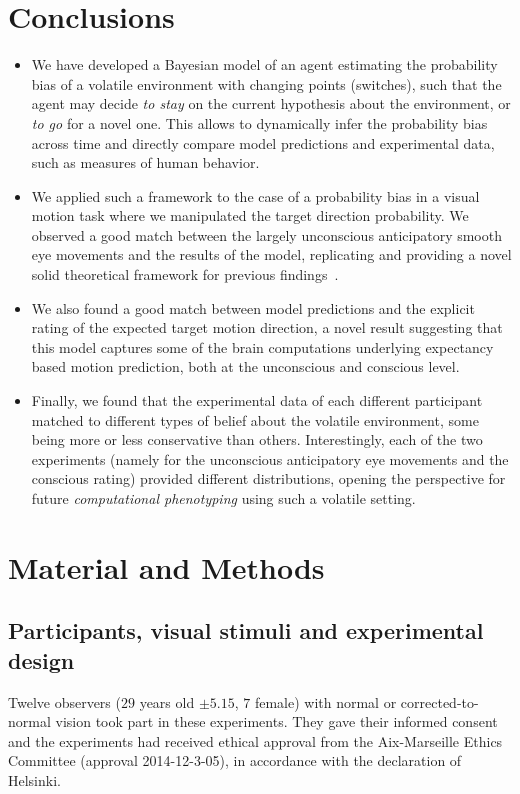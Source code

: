 \documentclass[10pt,letterpaper]{article}
\newcommand{\citep}[1]{\cite{#1}}
\begin{document}
\section{Conclusions}
\begin{itemize}\setlength{\itemsep}{0ex}
\item We have developed a Bayesian model of an agent estimating the probability bias of a volatile environment with changing points (switches), such that the agent may decide \textit{to stay} on the current hypothesis about the environment, or \textit{to go} for a novel one. This allows to dynamically infer the probability bias across time and directly compare model predictions and experimental data, such as measures of human behavior.
\item We applied such a framework to the case of a probability bias in a visual motion task where we manipulated the target direction probability. We observed a good match between the largely unconscious anticipatory smooth eye movements and the results of the model, replicating and providing a novel solid theoretical framework for previous findings~\citep{Montagnini2010, SantosKowler2017, Damasse18}.
\item We also found a good match between model predictions and the explicit rating of the expected target motion direction, a novel result suggesting that this model captures some of the brain computations underlying expectancy based motion prediction, both at the unconscious and conscious level.
\item Finally, we found that the experimental data of each different participant matched to different types of belief about the volatile environment, some being more or less conservative than others. Interestingly, each of the two experiments (namely for the unconscious anticipatory eye movements and the conscious rating) provided different distributions, opening the perspective for future \emph{computational phenotyping} using such a volatile setting.
\end{itemize}
\section{Material and Methods}
\label{sec:methods}
\subsection{Participants, visual stimuli and experimental design}
Twelve observers ($29$ years old $\pm 5.15$, $7$ female) with normal or corrected-to-normal vision took part in these experiments. They gave their informed consent and the experiments had received ethical approval from the Aix-Marseille Ethics Committee (approval 2014-12-3-05), in accordance with the declaration of Helsinki.
\end{document}
